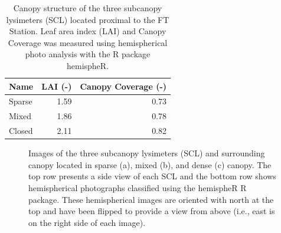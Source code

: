 \documentclass[
  letterpaper,
  DIV=11,
  numbers=noendperiod]{scrartcl}
\begin{document}
\begin{longtable}[]{@{}lrr@{}}

\caption{\label{tbl-scl-lai-cc}Canopy structure of the three subcanopy
lysimeters (SCL) located proximal to the FT Station. Leaf area index
(LAI) and Canopy Coverage was measured using hemispherical photo
analysis with the R package hemispheR.}

\tabularnewline

\toprule\noalign{}
Name & LAI (-) & Canopy Coverage (-) \\
\midrule\noalign{}
\endhead
\bottomrule\noalign{}
\endlastfoot
Sparse & 1.59 & 0.73 \\
Mixed & 1.86 & 0.78 \\
Closed & 2.11 & 0.82 \\

\end{longtable}

\begin{figure}[H]


\caption{\label{fig-scl-imgs}Images of the three subcanopy lysimeters
(SCL) and surrounding canopy located in sparse (a), mixed (b), and dense
(c) canopy. The top row presents a side view of each SCL and the bottom
row shows hemispherical photographs classified using the hemispheR R
package. These hemispherical images are oriented with north at the top
and have been flipped to provide a view from above (i.e., east is on the
right side of each image).}

\end{figure}%
\end{document}
